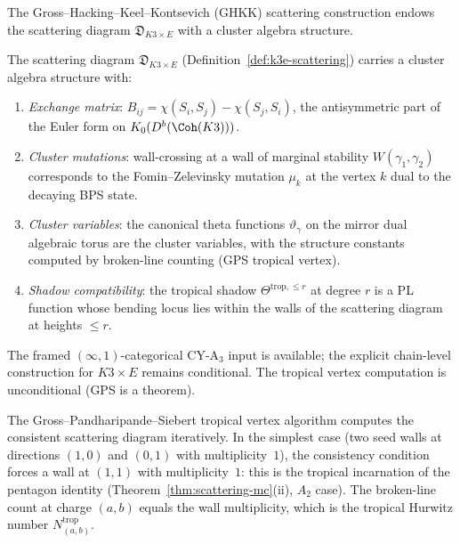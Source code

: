 The Gross--Hacking--Keel--Kontsevich (GHKK) scattering construction endows the scattering diagram $\mathfrak{D}_{K3 \times E}$ with a cluster algebra structure.

\begin{conjecture}
\label{conj:cluster-shadow}
\ClaimStatusConjectured
The scattering diagram $\mathfrak{D}_{K3 \times E}$ \textup{(}Definition~\textup{\ref{def:k3e-scattering})} carries a cluster algebra structure with:
\begin{enumerate}[label=\textup{(\roman*)}]
\item \emph{Exchange matrix}: $B_{ij} = \chi(S_i, S_j) - \chi(S_j, S_i)$, the antisymmetric part of the Euler form on $K_0(D^b(\Coh(K3)))$.
\item \emph{Cluster mutations}: wall-crossing at a wall of marginal stability $W(\gamma_1, \gamma_2)$ corresponds to the Fomin--Zelevinsky mutation $\mu_k$ at the vertex $k$ dual to the decaying BPS state.
\item \emph{Cluster variables}: the canonical theta functions $\vartheta_\gamma$ on the mirror dual algebraic torus are the cluster variables, with the structure constants computed by broken-line counting \textup{(}GPS tropical vertex\textup{)}.
\item \emph{Shadow compatibility}: the tropical shadow $\Theta^{\mathrm{trop},\leq r}$ at degree $r$ is a PL function whose bending locus lies within the walls of the scattering diagram at heights $\leq r$.
\end{enumerate}
The framed \((\infty,1)\)-categorical CY-A$_3$ input is available; the explicit chain-level construction for \(K3\times E\) remains conditional. The tropical vertex computation is unconditional \textup{(}GPS is a theorem\textup{)}.
\end{conjecture}

\begin{remark}
\label{rem:gps-pentagon}
The Gross--Pandharipande--Siebert tropical vertex algorithm computes the consistent scattering diagram iteratively. In the simplest case \textup{(}two seed walls at directions $(1,0)$ and $(0,1)$ with multiplicity~$1$\textup{)}, the consistency condition forces a wall at $(1,1)$ with multiplicity~$1$: this is the tropical incarnation of the pentagon identity \textup{(}Theorem~\textup{\ref{thm:scattering-mc}(ii)}, $A_2$ case\textup{)}. The broken-line count at charge $(a,b)$ equals the wall multiplicity, which is the tropical Hurwitz number $N_{(a,b)}^{\mathrm{trop}}$.
\end{remark}

